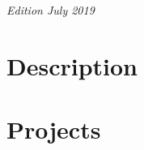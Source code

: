 \documentclass[11pt,fleqn]{book} %
\begin{document}
\noindent \textit{Edition July 2019 } %



\pagestyle{empty} %

\tableofcontents %

\cleardoublepage %

\pagestyle{fancy} %





\part{Description}







\part{Projects}


\end{document}
